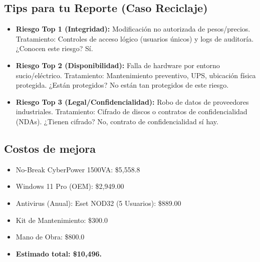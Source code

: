 \subsection{Tips para tu Reporte (Caso Reciclaje)}
\begin{itemize}
    \item \textbf{Riesgo Top 1 (Integridad):} Modificación no autorizada de pesos/precios. Tratamiento: Controles de acceso lógico (usuarios únicos) y logs de auditoría. ¿Conocen este riesgo? Sí.
    \item \textbf{Riesgo Top 2 (Disponibilidad):} Falla de hardware por entorno sucio/eléctrico. Tratamiento: Mantenimiento preventivo, UPS, ubicación física protegida. ¿Están protegidos? No están tan protegidos de este riesgo.
    \item \textbf{Riesgo Top 3 (Legal/Confidencialidad):} Robo de datos de proveedores industriales. Tratamiento: Cifrado de discos o contratos de confidencialidad (NDAs). ¿Tienen cifrado? No, contrato de confidencialidad sí hay.
\end{itemize}



\subsection{Costos de mejora}
\begin{itemize}
    \item No-Break CyberPower 1500VA: \$5,558.8
    \item Windows 11 Pro (OEM): \$2,949.00
    \item Antivirus (Anual): Eset NOD32 (5 Usuarios): \$889.00
    \item Kit de Mantenimiento: \$300.0
    \item Mano de Obra: \$800.0
    \item \textbf{Estimado total: \$10,496.}
\end{itemize}
